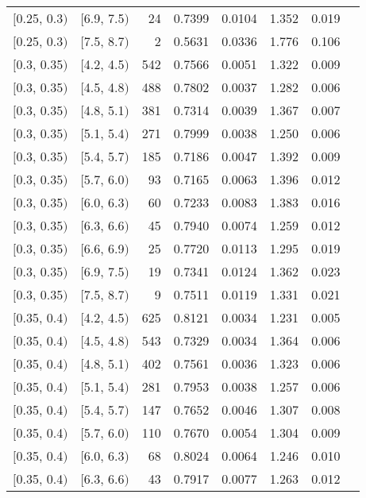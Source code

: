 \begin{longtable}{| l | l | r | r | r | r | r | r |}
        $[$0.25, 0.3$)$ & $[$6.9, 7.5$)$ & 24  & 0.7399 & 0.0104 & 1.352 & 0.019 \\
        $[$0.25, 0.3$)$ & $[$7.5, 8.7$)$ & 2   & 0.5631 & 0.0336 & 1.776 & 0.106 \\
        $[$0.3, 0.35$)$ & $[$4.2, 4.5$)$ & 542 & 0.7566 & 0.0051 & 1.322 & 0.009 \\
        $[$0.3, 0.35$)$ & $[$4.5, 4.8$)$ & 488 & 0.7802 & 0.0037 & 1.282 & 0.006 \\
        $[$0.3, 0.35$)$ & $[$4.8, 5.1$)$ & 381 & 0.7314 & 0.0039 & 1.367 & 0.007 \\
        $[$0.3, 0.35$)$ & $[$5.1, 5.4$)$ & 271 & 0.7999 & 0.0038 & 1.250 & 0.006 \\
        $[$0.3, 0.35$)$ & $[$5.4, 5.7$)$ & 185 & 0.7186 & 0.0047 & 1.392 & 0.009 \\
        $[$0.3, 0.35$)$ & $[$5.7, 6.0$)$ & 93  & 0.7165 & 0.0063 & 1.396 & 0.012 \\
        $[$0.3, 0.35$)$ & $[$6.0, 6.3$)$ & 60  & 0.7233 & 0.0083 & 1.383 & 0.016 \\
        $[$0.3, 0.35$)$ & $[$6.3, 6.6$)$ & 45  & 0.7940 & 0.0074 & 1.259 & 0.012 \\
        $[$0.3, 0.35$)$ & $[$6.6, 6.9$)$ & 25  & 0.7720 & 0.0113 & 1.295 & 0.019 \\
        $[$0.3, 0.35$)$ & $[$6.9, 7.5$)$ & 19  & 0.7341 & 0.0124 & 1.362 & 0.023 \\
        $[$0.3, 0.35$)$ & $[$7.5, 8.7$)$ & 9   & 0.7511 & 0.0119 & 1.331 & 0.021 \\
        $[$0.35, 0.4$)$ & $[$4.2, 4.5$)$ & 625 & 0.8121 & 0.0034 & 1.231 & 0.005 \\
        $[$0.35, 0.4$)$ & $[$4.5, 4.8$)$ & 543 & 0.7329 & 0.0034 & 1.364 & 0.006 \\
        $[$0.35, 0.4$)$ & $[$4.8, 5.1$)$ & 402 & 0.7561 & 0.0036 & 1.323 & 0.006 \\
        $[$0.35, 0.4$)$ & $[$5.1, 5.4$)$ & 281 & 0.7953 & 0.0038 & 1.257 & 0.006 \\
        $[$0.35, 0.4$)$ & $[$5.4, 5.7$)$ & 147 & 0.7652 & 0.0046 & 1.307 & 0.008 \\
        $[$0.35, 0.4$)$ & $[$5.7, 6.0$)$ & 110 & 0.7670 & 0.0054 & 1.304 & 0.009 \\
        $[$0.35, 0.4$)$ & $[$6.0, 6.3$)$ & 68  & 0.8024 & 0.0064 & 1.246 & 0.010 \\
        $[$0.35, 0.4$)$ & $[$6.3, 6.6$)$ & 43  & 0.7917 & 0.0077 & 1.263 & 0.012 \\

\end{longtable}
